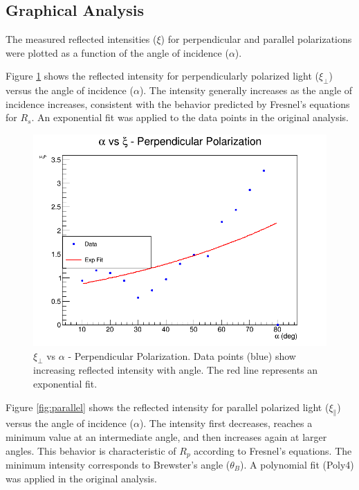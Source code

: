 \documentclass[journal]{IEEEtran}
\begin{document}
\subsection{Graphical Analysis}
The measured reflected intensities ($\xi$) for perpendicular and parallel polarizations were plotted as a function of the angle of incidence ($\alpha$).

Figure \ref{fig:perpendicular} shows the reflected intensity for perpendicularly polarized light ($\xi_{\perp}$) versus the angle of incidence ($\alpha$). The intensity generally increases as the angle of incidence increases, consistent with the behavior predicted by Fresnel's equations for $R_s$. An exponential fit was applied to the data points in the original analysis.

\begin{figure}[H]
    \centering
    \includegraphics[width=\linewidth]{../plots/perpendicular_plot.png}
    \caption{$\xi_{\perp}$ vs $\alpha$ - Perpendicular Polarization. Data points (blue) show increasing reflected intensity with angle. The red line represents an exponential fit.}
    \label{fig:perpendicular}
\end{figure}

Figure \ref{fig:parallel} shows the reflected intensity for parallel polarized light ($\xi_{\parallel}$) versus the angle of incidence ($\alpha$). The intensity first decreases, reaches a minimum value at an intermediate angle, and then increases again at larger angles. This behavior is characteristic of $R_p$ according to Fresnel's equations. The minimum intensity corresponds to Brewster's angle ($\theta_B$). A polynomial fit (Poly4) was applied in the original analysis.
\end{document}
